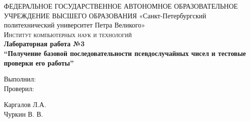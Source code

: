 \documentclass{article}
\begin{document}
	\begin{titlepage}
		\center 
		ФЕДЕРАЛЬНОЕ ГОСУДАРСТВЕННОЕ АВТОНОМНОЕ ОБРАЗОВАТЕЛЬНОЕ УЧРЕЖДЕНИЕ ВЫСШЕГО ОБРАЗОВАНИЯ\linebreak  
		«Санкт-Петербургский политехнический университет Петра Великого»\\[2cm]
		\textsc{\Large Институт компьютерных наук и технологий}\\[6.5cm]
		
		{\huge \bfseries Лабораторная работа №3\\[0.4cm]
			\Large \mdseries “Получение базовой последовательности псевдослучайных чисел и тестовые проверки его работы”}\\[6.5cm]
		
		\begin{multicols}{2}
			\begin{flushright} \large
				
				{Выполнил:}\\[0.5cm]
				
				{Проверил:}
				
			\end{flushright}
			\begin{flushright}
				
				{Каргалов Л.А.}\\[0.5cm]
				
				{Чуркин В. В.}
				
			\end{flushright}
		\end{multicols}

		\flushright{
			{\today}\\[0.5cm]
		}
		
		\vfill %
	\end{titlepage}
	
	\tableofcontents
	\setcounter{page}{2}
	\newpage
		
\end{document}
